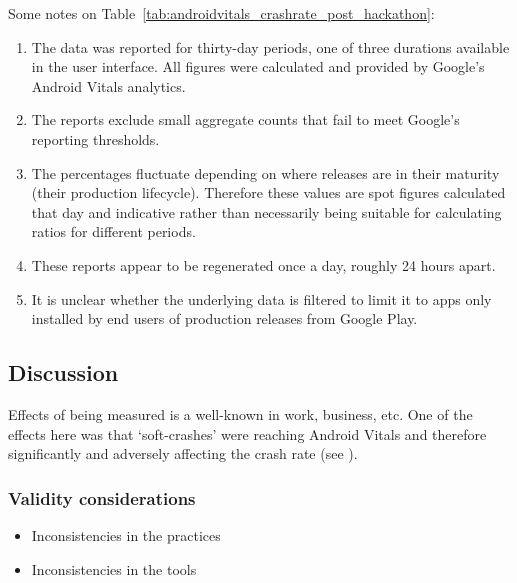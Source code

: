 Some notes on Table~\ref{tab:androidvitals_crashrate_post_hackathon}:
\begin{enumerate}
    \item The data was reported for thirty-day periods, one of three durations available in the user interface. All figures were calculated and provided by Google's Android Vitals analytics.
    \item The reports exclude small aggregate counts that fail to meet Google's reporting thresholds.
    \item The percentages fluctuate depending on where releases are in their maturity (their production lifecycle). Therefore these values are spot figures calculated that day and indicative rather than necessarily being suitable for calculating ratios for different periods. %
    \item These reports appear to be regenerated once a day, roughly 24 hours apart.
    \item It is unclear whether the underlying data is filtered to limit it to apps only installed by end users of production releases from Google Play.
\end{enumerate}




\subsection{Discussion}
Effects of being measured is a well-known in work, business, etc. One of the effects here was that `soft-crashes' were reaching Android Vitals and therefore significantly and adversely affecting the crash rate (see \citet{catroid_426_soft_crashes_should_not_be_reported_to_the_play_console}).

\subsubsection{Validity considerations}
\begin{itemize}
    \item Inconsistencies in the practices
    \item Inconsistencies in the tools
\end{itemize}

